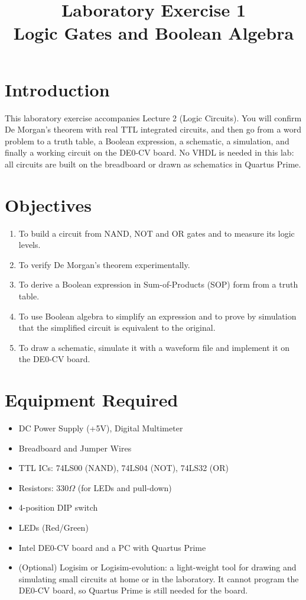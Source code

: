 \documentclass{article}
\title{Laboratory Exercise 1 \\ Logic Gates and Boolean Algebra}
\author{}
\date{}
\begin{document}
\maketitle

\section*{Introduction}
This laboratory exercise accompanies Lecture 2 (Logic Circuits). You will confirm De Morgan's theorem with real TTL integrated circuits, and then go from a word problem to a truth table, a Boolean expression, a schematic, a simulation, and finally a working circuit on the DE0-CV board. No VHDL is needed in this lab: all circuits are built on the breadboard or drawn as schematics in Quartus Prime.

\section*{Objectives}
\begin{enumerate}
    \item To build a circuit from NAND, NOT and OR gates and to measure its logic levels.
    \item To verify De Morgan's theorem experimentally.
    \item To derive a Boolean expression in Sum-of-Products (SOP) form from a truth table.
    \item To use Boolean algebra to simplify an expression and to prove by simulation that the simplified circuit is equivalent to the original.
    \item To draw a schematic, simulate it with a waveform file and implement it on the DE0-CV board.
\end{enumerate}

\section*{Equipment Required}
\begin{itemize}
    \item DC Power Supply (+5V), Digital Multimeter
    \item Breadboard and Jumper Wires
    \item TTL ICs: 74LS00 (NAND), 74LS04 (NOT), 74LS32 (OR)
    \item Resistors: $330\Omega$ (for LEDs and pull-down)
    \item 4-position DIP switch
    \item LEDs (Red/Green)
    \item Intel DE0-CV board and a PC with Quartus Prime
    \item (Optional) Logisim or Logisim-evolution: a light-weight tool for drawing and simulating small circuits at home or in the laboratory. It cannot program the DE0-CV board, so Quartus Prime is still needed for the board.
\end{itemize}
\end{document}
